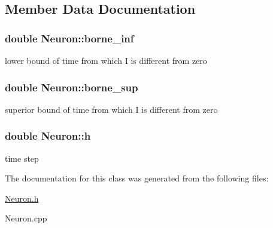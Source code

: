 \subsection{Member Data Documentation}
\hypertarget{classNeuron_ae90ea57c6d9559c8adeb5c46ee6778e1}{
\subsubsection[{borne\-\_\-inf}]{\setlength{\rightskip}{0pt plus 5cm}double Neuron\-::borne\-\_\-inf}}\label{classNeuron_ae90ea57c6d9559c8adeb5c46ee6778e1}
lower bound of time from which I is different from zero \hypertarget{classNeuron_af8db865bd7e1f841035fbd99c821dbed}{
\subsubsection[{borne\-\_\-sup}]{\setlength{\rightskip}{0pt plus 5cm}double Neuron\-::borne\-\_\-sup}}\label{classNeuron_af8db865bd7e1f841035fbd99c821dbed}
superior bound of time from which I is different from zero \hypertarget{classNeuron_ae540cc540666b20457f914d7116eea24}{
\subsubsection[{h}]{\setlength{\rightskip}{0pt plus 5cm}double Neuron\-::h}}\label{classNeuron_ae540cc540666b20457f914d7116eea24}
time step 

The documentation for this class was generated from the following files\-:\begin{DoxyCompactItemize}
\item 
\hyperlink{Neuron_8h}{Neuron.\-h}\item 
Neuron.\-cpp\end{DoxyCompactItemize}

